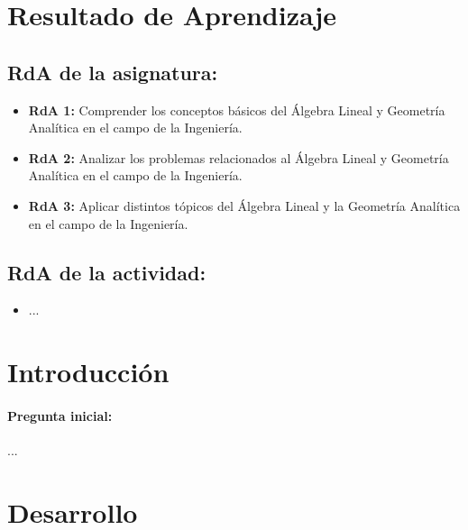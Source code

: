 \documentclass[a4,11pt]{aleph-notas}
\begin{document}
\encabezado


\section*{Resultado de Aprendizaje}

\subsection*{RdA de la asignatura:}
\begin{itemize}[leftmargin=*]
    \item \textbf{RdA 1:} Comprender los conceptos básicos del Álgebra Lineal y Geometría Analítica en el campo de la Ingeniería.
    \item \textbf{RdA 2:} Analizar los problemas relacionados al Álgebra Lineal y Geometría Analítica en el campo de la Ingeniería.
    \item \textbf{RdA 3:} Aplicar distintos tópicos del Álgebra Lineal y la Geometría Analítica en el campo de la Ingeniería.
\end{itemize}

\subsection*{RdA de la actividad:}
\begin{itemize}[leftmargin=*]
    \item ...
\end{itemize}

\section*{Introducción}

\paragraph{Pregunta inicial:} 
...

\section*{Desarrollo}
\end{document}
